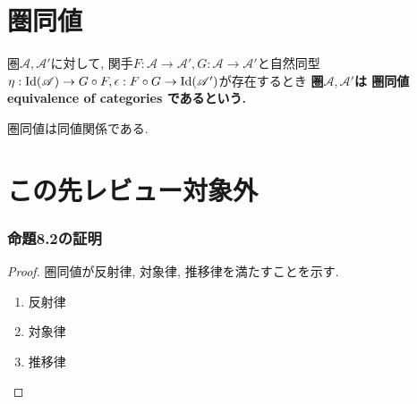 \section{圏同値}
\begin{Def}
圏$\mathscr{A},\mathscr{A}'$に対して, 関手$F:\mathscr{A}\rightarrow\mathscr{A}', G:\mathscr{A}\rightarrow\mathscr{A}'$と自然同型$\eta:\mathrm{Id}(\mathscr{A})\rightarrow G\circ F,\epsilon:F\circ G\rightarrow\rm{Id}(\mathscr{A}')$が存在するとき
\bf{圏$\mathscr{A},\mathscr{A}'$は
圏同値 equivalence of categories
である}という.
\end{Def}
\begin{Prop}
圏同値は同値関係である.
\end{Prop}

\begin{comment}
\section{Haskにおける自然同型}
\subsection{mirror関数}
Tree関手からTree関手への自然同型
\subsection{Maybe関手とEither()関手の間の自然同型}
\section{まとめ}
aa
\end{comment}

\section{この先レビュー対象外}
\subsubsection{命題8.2の証明}
\begin{proof}
圏同値が反射律, 対象律, 推移律を満たすことを示す.
\begin{enumerate}
\item 反射律
\item 対象律
\item 推移律
\end{enumerate}
\end{proof}
